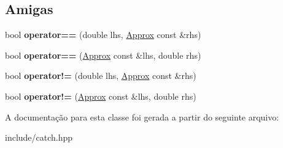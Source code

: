 \subsection*{Amigas}
\begin{DoxyCompactItemize}
\item 
bool {\bfseries operator==} (double lhs, \hyperlink{classCatch_1_1Detail_1_1Approx}{Approx} const \&rhs)\hypertarget{classCatch_1_1Detail_1_1Approx_ac766f044f1c63f0c5997982baefd9049}{}\label{classCatch_1_1Detail_1_1Approx_ac766f044f1c63f0c5997982baefd9049}

\item 
bool {\bfseries operator==} (\hyperlink{classCatch_1_1Detail_1_1Approx}{Approx} const \&lhs, double rhs)\hypertarget{classCatch_1_1Detail_1_1Approx_a35999631e6cef569f9da9f3fa910db22}{}\label{classCatch_1_1Detail_1_1Approx_a35999631e6cef569f9da9f3fa910db22}

\item 
bool {\bfseries operator!=} (double lhs, \hyperlink{classCatch_1_1Detail_1_1Approx}{Approx} const \&rhs)\hypertarget{classCatch_1_1Detail_1_1Approx_a83b3763569a7ecc143c335b630be0e47}{}\label{classCatch_1_1Detail_1_1Approx_a83b3763569a7ecc143c335b630be0e47}

\item 
bool {\bfseries operator!=} (\hyperlink{classCatch_1_1Detail_1_1Approx}{Approx} const \&lhs, double rhs)\hypertarget{classCatch_1_1Detail_1_1Approx_a7497ef839f8026cc0edd6269a80f3e09}{}\label{classCatch_1_1Detail_1_1Approx_a7497ef839f8026cc0edd6269a80f3e09}

\end{DoxyCompactItemize}


A documentação para esta classe foi gerada a partir do seguinte arquivo\+:\begin{DoxyCompactItemize}
\item 
include/catch.\+hpp\end{DoxyCompactItemize}
